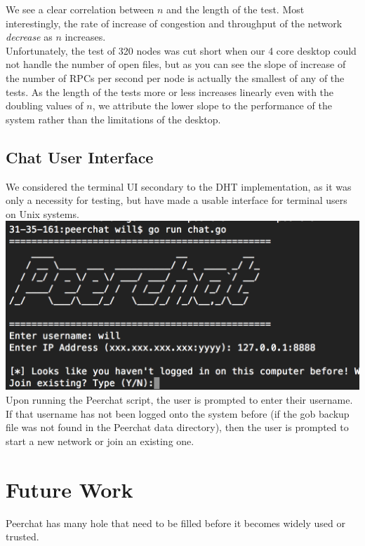 \documentclass{article}
\begin{document}
We see a clear correlation between $n$ and the length of the test. Most interestingly, the rate of increase of congestion and throughput of the network \textit{decrease} as $n$ increases. \\

Unfortunately, the test of 320 nodes was cut short when our 4 core desktop could not handle the number of open files, but as you can see the slope of increase of the number of RPCs per second per node is actually the smallest of any of the tests. As the length of the tests more or less increases linearly even with the doubling values of $n$, we attribute the lower slope to the performance of the system rather than the limitations of the desktop. 

\subsection{Chat User Interface}

We considered the terminal UI secondary to the DHT implementation, as it was only a necessity for testing, but have made a usable interface for terminal users on Unix systems. \\

\includegraphics[scale=0.8]{ui} \\

Upon running the Peerchat script, the user is prompted to enter their username. If that username has not been logged onto the system before (if the gob backup file was not found in the Peerchat data directory), then the user is prompted to start a new network or join an existing one. 

\section{Future Work}

Peerchat has many hole that need to be filled before it becomes widely used or trusted. 
\end{document}
